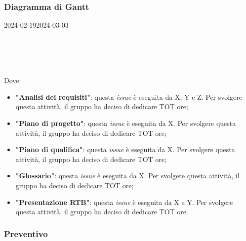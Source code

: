 
\subsubsection{Diagramma di Gantt}

\begin{ganttchart}[
		x unit=0.6cm, %
		y unit chart=0.6cm,
		bar/.style={fill=blue!50},
		bar height=0.5,
		time slot format=isodate,
		time slot unit=day,
		vgrid,
		today=2024-02-19,
		today rule/.style={draw=red, ultra thick}
	]{2024-02-19}{2024-03-03}
	 \\
	 \\
	 \\
	 \\
	 \\
\end{ganttchart}

Dove:
\begin{itemize}
	\item \textbf{"Analisi dei requisiti"}: questa \textit{issue} è eseguita da
	      X, Y e Z. Per
	      svolgere questa attività, il gruppo ha deciso di dedicare TOT ore;

	\item \textbf{"Piano di progetto"}: questa \textit{issue} è eseguita da
	      X. Per svolgere questa attività, il gruppo ha deciso
	      di dedicare TOT ore;

	\item \textbf{"Piano di qualifica"}: questa \textit{issue} è eseguita da
	      X. Per svolgere questa attività, il gruppo ha
	      deciso di dedicare TOT ore;

	\item \textbf{"Glossario"}: questa \textit{issue} è eseguita da X. 
			Per svolgere questa attività, il gruppo ha deciso di
	      dedicare TOT ore;

	\item \textbf{"Presentazione RTB"}: questa \textit{issue} è eseguita
	      da X e Y. Per svolgere questa
	      attività, il gruppo ha deciso di dedicare TOT ore.
\end{itemize}

\subsubsection{Preventivo}

